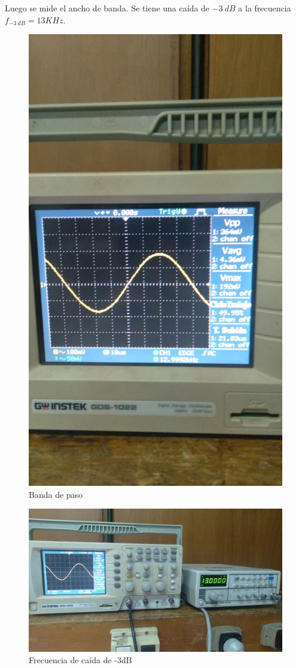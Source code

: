Luego se mide el ancho de banda. Se tiene una caída de \(-3~dB\) a la frecuencia \(f_{-3~dB}= 13KHz\).
\begin{figure}[H]
    \centering
    \includegraphics[width=0.8\linewidth]{img/Banda de paso.jpeg}
    \caption{Banda de paso}
    
\end{figure}
\begin{figure}[H]
    \centering
    \includegraphics[width=0.8\linewidth]{img/Ancho de banda.jpeg}
    \caption{Frecuencia de caída de -3dB}
    
\end{figure}

